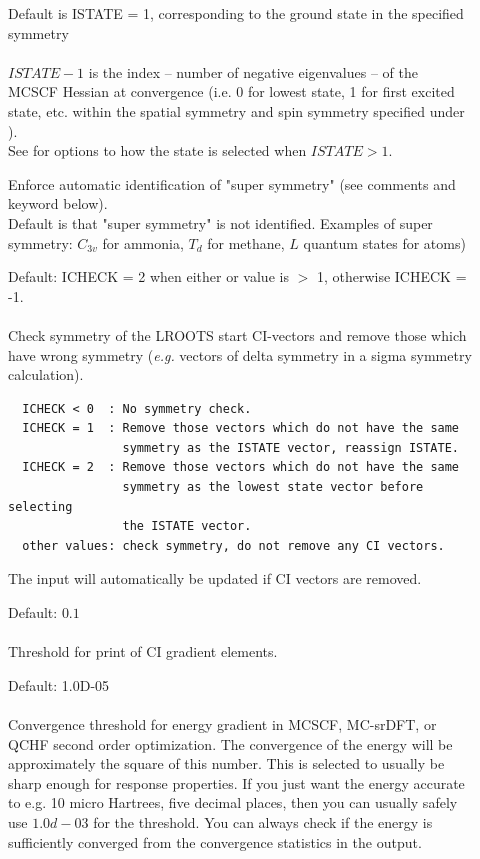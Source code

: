 \begin{description}
\item[]
  Default is ISTATE = 1, corresponding to the ground state in the specified symmetry\\
   \\
  $ISTATE-1$ is the index -- number of negative eigenvalues -- of the MCSCF Hessian
  at convergence (i.e. 0 for lowest state, 1 for first excited state, etc. within the spatial symmetry and
  spin symmetry
  specified under ).\\
  See  for options to how the state is selected when $ISTATE > 1$.

\item[]
  Enforce automatic identification of "super symmetry"
   (see comments and  keyword below).\\
  Default is that "super symmetry" is not identified.
  Examples of super symmetry: $C_{3v}$ for ammonia, $T_d$ for methane, $L$ quantum states for atoms)

\item[]
Default: ICHECK = 2 when either  or  value is $>$ 1, otherwise ICHECK = -1.\\
   \\
  Check symmetry of the LROOTS start CI-vectors and remove those which
  have wrong symmetry ({\it e.g.\/} vectors of delta symmetry in a sigma
  symmetry calculation).
\begin{verbatim}
  ICHECK < 0  : No symmetry check.
  ICHECK = 1  : Remove those vectors which do not have the same
                symmetry as the ISTATE vector, reassign ISTATE.
  ICHECK = 2  : Remove those vectors which do not have the same
                symmetry as the lowest state vector before selecting
                the ISTATE vector.
  other values: check symmetry, do not remove any CI vectors.
\end{verbatim}
  The  input will automatically be
  updated if CI vectors are removed.

\item[] Default: $0.1$ \\
   \\
  Threshold for print of CI gradient elements.

\item[]
  Default: 1.0D-05\\
   \\
  Convergence threshold for energy gradient in MCSCF, MC-srDFT, or QCHF second order optimization.
  The convergence of the energy will be approximately the square of this
  number. This is selected to usually be sharp enough for response properties.
  If you just want the energy accurate to e.g. 10 micro Hartrees, five decimal places,
  then you can usually safely use $1.0d-03$ for the threshold.
  You can always check if the energy is sufficiently converged from the convergence statistics
  in the output.


\end{description}
